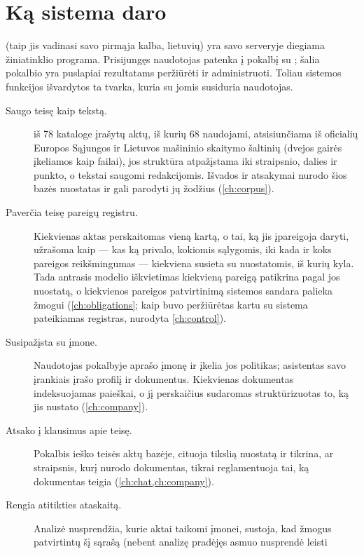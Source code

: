 \section{Ką sistema daro}\label{sec:intro:does}

\product{} (taip jis vadinasi savo pirmąja kalba, lietuvių) yra savo serveryje diegiama
žiniatinklio programa. Prisijungęs naudotojas patenka į pokalbį su ; šalia pokalbio yra puslapiai rezultatams peržiūrėti ir administruoti. Toliau sistemos funkcijos
išvardytos ta tvarka, kuria su jomis susiduria naudotojas.

\begin{description}
  \item[Saugo teisę kaip tekstą.]  iš 78 kataloge įrašytų aktų, iš kurių
    68 naudojami, atsisiunčiama iš oficialių Europos Sąjungos ir Lietuvos mašininio skaitymo
    šaltinių (dvejos gairės įkeliamos kaip failai), jos struktūra atpažįstama iki straipsnio,
    dalies ir punkto, o tekstai saugomi redakcijomis. Išvados ir atsakymai nurodo šios bazės
    nuostatas ir gali parodyti jų žodžius (\cref{ch:corpus}).
  \item[Paverčia teisę pareigų registru.] Kiekvienas aktas perskaitomas vieną kartą, o tai, ką
    jis įpareigoja daryti, užrašoma kaip  --- kas ką privalo, kokiomis sąlygomis,
    iki kada ir koks pareigos reikšmingumas --- kiekviena susieta su nuostatomis, iš kurių kyla.
    Tada antrasis modelio iškvietimas kiekvieną pareigą patikrina pagal jos nuostatą, o
    kiekvienos pareigos patvirtinimą sistemos sandara palieka žmogui (\cref{ch:obligations};
    kaip buvo peržiūrėtas kartu su sistema pateikiamas registras, nurodyta
    \cref{ch:control}).
  \item[Susipažįsta su įmone.] Naudotojas pokalbyje aprašo įmonę ir įkelia jos politikas;
    asistentas savo įrankiais įrašo profilį ir dokumentus. Kiekvienas dokumentas indeksuojamas
    paieškai, o jį perskaičius sudaromas struktūrizuotas  to, ką jis nustato
    (\cref{ch:company}).
  \item[Atsako į klausimus apie teisę.] Pokalbis ieško teisės aktų bazėje, cituoja tikslią
    nuostatą ir tikrina, ar straipsnis, kurį nurodo dokumentas, tikrai reglamentuoja tai, ką
    dokumentas teigia (\cref{ch:chat,ch:company}).
  \item[Rengia atitikties ataskaitą.] Analizė nusprendžia, kurie aktai taikomi įmonei,
    sustoja, kad žmogus patvirtintų šį sąrašą (nebent analizę pradėjęs asmuo nusprendė leisti

\end{description}
